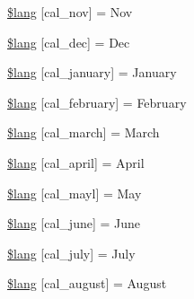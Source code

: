 \begin{DoxyCompactItemize}
\item 
\hyperlink{system_2language_2english_2calendar__lang_8php_a6c8f862507c12a677f22d9df6bf92515}{\$lang} \mbox{[}\textquotesingle{}cal\+\_\+nov\textquotesingle{}\mbox{]} = \textquotesingle{}Nov\textquotesingle{}
\item 
\hyperlink{system_2language_2english_2calendar__lang_8php_ab97feaeee2a9c0746ca0a3631c6f70db}{\$lang} \mbox{[}\textquotesingle{}cal\+\_\+dec\textquotesingle{}\mbox{]} = \textquotesingle{}Dec\textquotesingle{}
\item 
\hyperlink{system_2language_2english_2calendar__lang_8php_a8b4025982a3bddb1a5cfd4c37dd5e859}{\$lang} \mbox{[}\textquotesingle{}cal\+\_\+january\textquotesingle{}\mbox{]} = \textquotesingle{}January\textquotesingle{}
\item 
\hyperlink{system_2language_2english_2calendar__lang_8php_a32a50b63add7abc253c9bc36f4fa6f72}{\$lang} \mbox{[}\textquotesingle{}cal\+\_\+february\textquotesingle{}\mbox{]} = \textquotesingle{}February\textquotesingle{}
\item 
\hyperlink{system_2language_2english_2calendar__lang_8php_af69ae8067fe6af9913575c2338bdcb00}{\$lang} \mbox{[}\textquotesingle{}cal\+\_\+march\textquotesingle{}\mbox{]} = \textquotesingle{}March\textquotesingle{}
\item 
\hyperlink{system_2language_2english_2calendar__lang_8php_a91b47019689ab8d459212335c8bb558f}{\$lang} \mbox{[}\textquotesingle{}cal\+\_\+april\textquotesingle{}\mbox{]} = \textquotesingle{}April\textquotesingle{}
\item 
\hyperlink{system_2language_2english_2calendar__lang_8php_a000c61063bbbaeda4e1e0f81717cf6f2}{\$lang} \mbox{[}\textquotesingle{}cal\+\_\+mayl\textquotesingle{}\mbox{]} = \textquotesingle{}May\textquotesingle{}
\item 
\hyperlink{system_2language_2english_2calendar__lang_8php_acf04877cbc6934c38186bfaad8f7c4f0}{\$lang} \mbox{[}\textquotesingle{}cal\+\_\+june\textquotesingle{}\mbox{]} = \textquotesingle{}June\textquotesingle{}
\item 
\hyperlink{system_2language_2english_2calendar__lang_8php_a067d03b1260e590cabb18e68c08f3868}{\$lang} \mbox{[}\textquotesingle{}cal\+\_\+july\textquotesingle{}\mbox{]} = \textquotesingle{}July\textquotesingle{}
\item 
\hyperlink{system_2language_2english_2calendar__lang_8php_a8e8cfd4eda2dda803f5c4f6cbbf2279f}{\$lang} \mbox{[}\textquotesingle{}cal\+\_\+august\textquotesingle{}\mbox{]} = \textquotesingle{}August\textquotesingle{}
\item 

\end{DoxyCompactItemize}
